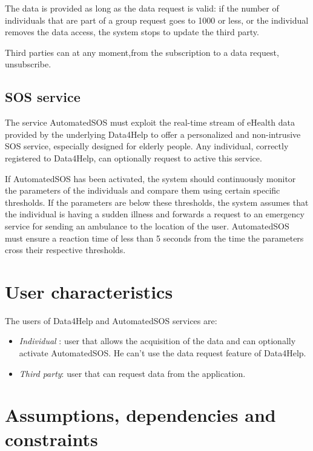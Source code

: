 The data is provided as long as the data request is valid: if the number of individuals that are part of a group request goes to 1000 or less, or the individual removes the data access, the system stops to update the third party.

Third parties can at any moment,from the subscription to a data request, unsubscribe.





\subsection{SOS service}
The service AutomatedSOS must exploit the real-time stream of eHealth data provided by the underlying Data4Help to offer a personalized and non-intrusive SOS service, especially designed for elderly people.
Any individual, correctly registered to Data4Help, can optionally request to active this service.


If AutomatedSOS has been activated, the system should continuously monitor the parameters of the individuals and compare them using certain specific thresholds.
If the parameters are below these thresholds, the system assumes that the individual is having a sudden illness and forwards a request to an emergency service for sending an ambulance to the location of the user.
AutomatedSOS must ensure a reaction time of less than 5 seconds from the time the parameters cross their respective thresholds.










\section{User characteristics}
The users of Data4Help and AutomatedSOS services are:

\begin{itemize}
\item \textit{Individual} : user that allows the acquisition of the data and can optionally activate AutomatedSOS. He can't use the data request feature of Data4Help.
\item \textit{Third party}: user that can request data from the application.
\end{itemize}





\section{Assumptions, dependencies and constraints}


